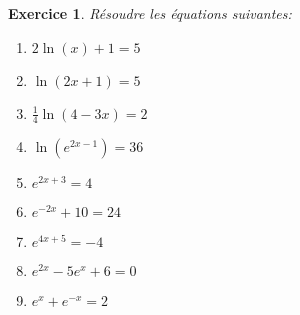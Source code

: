 \documentclass[12pt]{article}
\newtheorem{exercice}{\bf Exercice}
\newtheorem{correction}{\bf Correction exercice}
\newenvironment{exo}{
\begin{exercice}\smallskip\normalfont}{\end{exercice}
}
\newenvironment{cor}{
\begin{correction}\smallskip\normalfont}{\end{correction}
}
\newif\ifcorrige\corrigefalse
\begin{document}
\ifcorrige
\color{magenta}
\begin{cor}
Dans tout cet exercice, on utilise $\ln(a \times b) = \ln a + \ln b$ et $\ln(a^n) = n \ln a$
(et les m\^emes relations sont valables avec $\log$ \`a la place de $\ln$).
\begin{enumerate}
\item
  \begin{align*}
    \log(18) - \log(24) - \log(2)
    &=
    \log(2\times 3^2) - \log(2^3 \times 3) - \log(2)
    \\
    &= \log 2 + \log(3^2) - \log (2^3) - \log 3 - \log 2
    \\
    &= \log 2 + 2 \log 3 - 3 \log 2 - \log 3 - \log 2
    \\
    &= -3 \log 2 + \log 3
  \end{align*}
\item
  \begin{align*}
    \ln(2) + \ln(3x) - \ln (2x)
    = \ln(2) + \ln(3) + \ln(x) - \ln (2) - \ln(x)
    = \ln(3)
  \end{align*}

\item
  \begin{align*}
    \ln(3x^2) + \ln(2x) - \ln (6x^3)
    &= \ln(3) + 2\ln(x) + \ln(2) + \ln(x) - \ln(6) - 3 \ln(x)
    \\
    &= \ln(3) + \ln(2) - \ln(2 \times 3)
    \\
    &= 0
  \end{align*}

\item
  \begin{align*}
    \log (5x^2) - \log(10x^2) + \log(4x)
    &= \log(5) + 2 \log(x) - \log(10) - 2 \log(x) + \log(4) + \log (x)
    \\
    &= \log(x) + \log(5) - \log(2 \times 5) + \log(2^2)
    \\
    &= \log(x) + \log(2)
  \end{align*}
\end{enumerate}
\end{cor}
\color{black}
\fi


\begin{exo} R\'esoudre les \'equations suivantes:
\begin{multicols}{3}
\begin{enumerate}
\item $2 \ln (x) + 1 = 5$
\item $\ln(2x+1) = 5$
\item $\frac14 \ln (4-3x) = 2$
\item $\ln( e^{2x-1} ) = 36$
\item $e^{2x+3} = 4$
\item $e^{-2x} + 10 = 24$
\item $e^{4x+5} = -4$
\item $e^{2x} - 5 e^{x} + 6 = 0$
\item $e^x + e^{-x} = 2$
\end{enumerate}
\end{multicols}
\end{exo}
\end{document}
